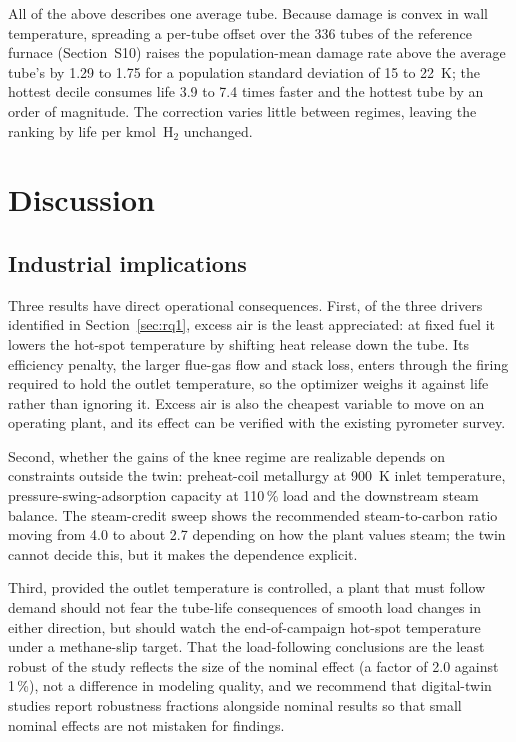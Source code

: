 \documentclass[final,3p,times]{elsarticle}
\begin{document}
All of the above describes one average tube. Because damage is convex in wall temperature, spreading a per-tube offset over the 336 tubes of the reference furnace (Section~S10) raises the population-mean damage rate above the average tube's by 1.29 to 1.75 for a population standard deviation of 15 to 22~K; the hottest decile consumes life 3.9 to 7.4 times faster and the hottest tube by an order of magnitude. The correction varies little between regimes, leaving the ranking by life per kmol~H$_2$ unchanged.

\section{Discussion}
\label{sec:discussion}

\subsection{Industrial implications}

Three results have direct operational consequences. First, of the three drivers identified in Section~\ref{sec:rq1}, excess air is the least appreciated: at fixed fuel it lowers the hot-spot temperature by shifting heat release down the tube. Its efficiency penalty, the larger flue-gas flow and stack loss, enters through the firing required to hold the outlet temperature, so the optimizer weighs it against life rather than ignoring it. Excess air is also the cheapest variable to move on an operating plant, and its effect can be verified with the existing pyrometer survey.

Second, whether the gains of the knee regime are realizable depends on constraints outside the twin: preheat-coil metallurgy at 900~K inlet temperature, pressure-swing-adsorption capacity at 110\,\% load and the downstream steam balance. The steam-credit sweep shows the recommended steam-to-carbon ratio moving from 4.0 to about 2.7 depending on how the plant values steam; the twin cannot decide this, but it makes the dependence explicit.

Third, provided the outlet temperature is controlled, a plant that must follow demand should not fear the tube-life consequences of smooth load changes in either direction, but should watch the end-of-campaign hot-spot temperature under a methane-slip target. That the load-following conclusions are the least robust of the study reflects the size of the nominal effect (a factor of 2.0 against 1\,\%), not a difference in modeling quality, and we recommend that digital-twin studies report robustness fractions alongside nominal results so that small nominal effects are not mistaken for findings.
\end{document}
